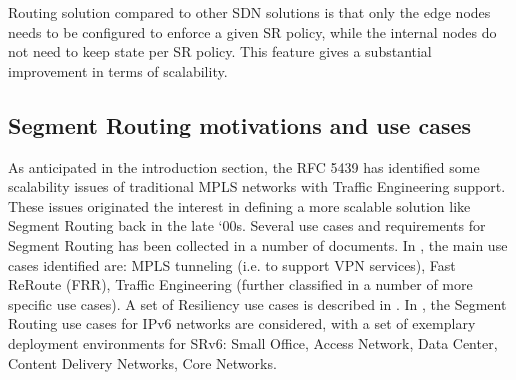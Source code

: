 Routing solution compared to other SDN solutions is that only the edge nodes needs to be configured to enforce a given SR policy, while the internal nodes do not need to keep state per SR policy. This feature gives a substantial improvement in terms of scalability. 

\subsection{Segment Routing motivations and use cases}

As anticipated in the introduction section, the RFC 5439 \cite{rfc5439} has identified some scalability issues of traditional MPLS networks with Traffic Engineering support. These issues originated the interest in defining a more scalable solution like Segment Routing back in the late `00s. Several use cases and requirements for Segment Routing has been collected in a number of documents. In \cite{rfc7855}, the main use cases identified are: MPLS tunneling (i.e. to support VPN services), Fast ReRoute (FRR), Traffic Engineering (further classified in a number of more specific use cases). A set of Resiliency use cases is described in \cite{rfc8355}. In \cite{rfc8354}, the Segment Routing use cases for IPv6 networks are considered, with a set of exemplary deployment environments for SRv6: Small Office, Access Network, Data Center, Content Delivery Networks, Core Networks.

